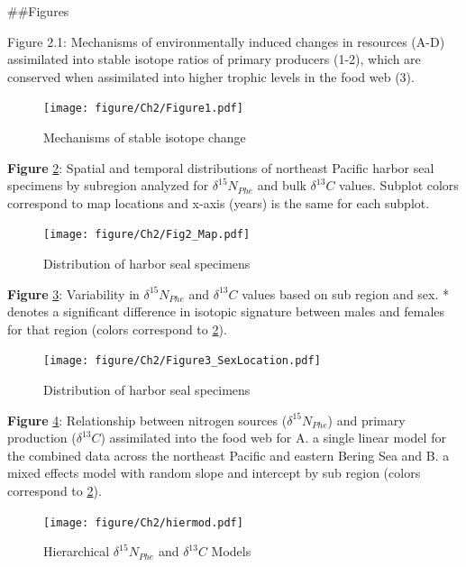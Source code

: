 \documentclass [11pt, proquest] {uwthesis}[2015/03/03]
\begin{document}
\clearpage

\#\#Figures
\begin{landscape}

Figure 2.1: Mechanisms of environmentally induced changes in resources (A-D) assimilated into stable isotope ratios of primary producers (1-2), which are conserved when assimilated into higher trophic levels in the food web (3).\newline 
\begin{figure}[h]
\centering
  \texttt{[image: figure/Ch2/Figure1.pdf]}
  \caption{Mechanisms of stable isotope change}
  \label{fig:theo}
\end{figure}
\end{landscape}
\clearpage

\textbf{Figure} \ref{fig:map}: Spatial and temporal distributions of northeast Pacific harbor seal specimens by subregion analyzed for \(\delta^{15}N_{Phe}\) and bulk \(\delta^{13}C\) values. Subplot colors correspond to map locations and x-axis (years) is the same for each subplot.\newline 
\begin{figure}[h]
\centering
  \texttt{[image: figure/Ch2/Fig2\_Map.pdf]}
  \caption{Distribution of harbor seal specimens}
  \label{fig:map}
\end{figure}
\clearpage

\textbf{Figure} \ref{fig:dist}: Variability in \(\delta^{15}N_{Phe}\) and \(\delta^{13}C\) values based on sub region and sex. * denotes a significant difference in isotopic signature between males and females for that region (colors correspond to \ref{fig:map}).
\newline 
\begin{figure}[h]
\centering
  \texttt{[image: figure/Ch2/Figure3\_SexLocation.pdf]}
  \caption{Distribution of harbor seal specimens}
  \label{fig:dist}
\end{figure}
\clearpage

\textbf{Figure} \ref{fig:hiermod}: Relationship between nitrogen sources (\(\delta^{15}N_{Phe}\)) and primary production (\(\delta^{13}C\)) assimilated into the food web for A. a single linear model for the combined data across the northeast Pacific and eastern Bering Sea and B. a mixed effects model with random slope and intercept by sub region (colors correspond to \ref{fig:map}).
\newline 
\begin{figure}[h]
\centering
  \texttt{[image: figure/Ch2/hiermod.pdf]}
  \caption{Hierarchical $\delta^{15}N_{Phe}$ and $\delta^{13}C$ Models}
  \label{fig:hiermod}
\end{figure}
\clearpage
\end{document}
